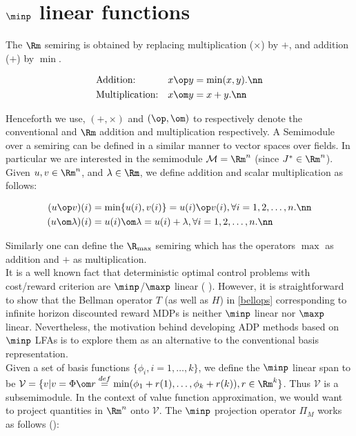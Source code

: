 \section{$\minp$ linear functions}\label{semiring}
The $\Rm$ semiring is obtained by replacing multiplication ($\times$) by $+$, and addition ($+$) by $\min$.
\begin{definition}
\begin{align}
&\text{Addition:} &x \op y&= \min(x,y).\nn\\
&\text{Multiplication:} &x \om y&= x+y.\nn
\end{align}
\end{definition}
Henceforth we use, $(+, \times)$ and $(\op,\om)$ to respectively denote the conventional and $\Rm$ addition and multiplication respectively.
A Semimodule over a semiring can be defined in a similar manner to vector spaces over fields. In particular we are interested in the semimodule $\mathcal{M}=\Rm^n$ (since $J^* \in \Rm^n$). Given $u, v \in \Rm^n$, and $\lambda \in \Rm$, we define addition and scalar multiplication as follows:
\begin{definition}
\begin{align}
(u\op v)(i)&=\min\{u(i),v(i)\}=u(i)\op v(i), \forall i=1,2,\ldots,n.\nn\\
(u\om \lambda)(i)&=u(i)\om \lambda=u(i)+\lambda, \forall i=1,2,\ldots,n.\nn
\end{align}
\end{definition}
Similarly one can define the $\R_{\max}$ semiring which has the operators $\max$ as addition and $+$ as multiplication.\\
\indent It is a well known fact that deterministic optimal control problems with cost/reward criterion are $\minp$/$\maxp$ linear (\cite{akian,Gaubert,mc2009,gaubert2011} ). However, it is straightforward to show that the Bellman operator $T$ (as well as $H$) in \eqref{bellops}  corresponding to infinite horizon discounted reward MDPs is neither $\minp$ linear nor $\maxp$ linear. Nevertheless, the motivation behind developing ADP methods based on $\minp$ LFAs is to explore them as an alternative to the conventional basis representation. \\
Given a set of basis functions $\{\phi_i,i=1,\ldots,k\}$, we define the $\minp$ linear span to be $\mathcal{V}=\{v|v=\Phi\om r\stackrel{def}{=}\min(\phi_1+r(1),\ldots,\phi_k+r(k)), r \in \Rm^k\}$. Thus $\mathcal{V}$ is a subsemimodule. In the context of value function approximation, we would want to project quantities in $\Rm^n$ onto $\mathcal{V}$. The $\minp$ projection operator $\Pi_M$ works as follows (\cite{akian,cohen1996kernels,Gaubert}):
